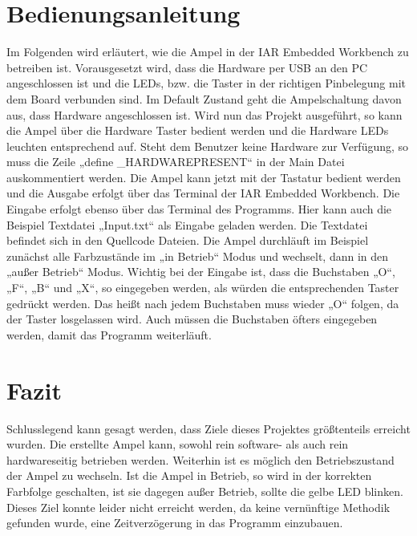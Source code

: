 \chapter{Bedienungsanleitung}
Im Folgenden wird erläutert, wie die Ampel in der IAR Embedded Workbench zu betreiben ist. Vorausgesetzt wird, dass die Hardware per USB an den PC angeschlossen ist und die LEDs, bzw. die Taster in der richtigen Pinbelegung mit dem Board verbunden sind. Im Default Zustand geht die Ampelschaltung davon aus, dass Hardware angeschlossen ist. Wird nun das Projekt ausgeführt, so kann die Ampel über die Hardware Taster bedient werden und die Hardware LEDs leuchten entsprechend auf. Steht dem Benutzer keine Hardware zur Verfügung, so muss die Zeile „define \_HARDWAREPRESENT“ in der Main Datei auskommentiert werden. Die Ampel kann jetzt mit der Tastatur bedient werden und die Ausgabe erfolgt über das Terminal der IAR Embedded Workbench. Die Eingabe erfolgt ebenso über das Terminal des Programms. Hier kann auch die Beispiel Textdatei „Input.txt“ als Eingabe geladen werden. Die Textdatei befindet sich in den Quellcode Dateien. Die Ampel durchläuft im Beispiel zunächst alle Farbzustände im „in Betrieb“ Modus und wechselt, dann in den „außer Betrieb“ Modus. Wichtig bei der Eingabe ist, dass die Buchstaben „O“, „F“, „B“ und „X“, so eingegeben werden, als würden die entsprechenden Taster gedrückt werden. Das heißt nach jedem Buchstaben muss wieder „O“ folgen, da der Taster losgelassen wird. Auch müssen die Buchstaben öfters eingegeben werden, damit das Programm weiterläuft.

\chapter{Fazit}
Schlusslegend kann gesagt werden, dass Ziele dieses Projektes größtenteils erreicht wurden. Die erstellte Ampel kann, sowohl rein software- als auch rein hardwareseitig betrieben werden. Weiterhin ist es möglich den Betriebszustand der Ampel zu wechseln. Ist die Ampel in Betrieb, so wird in der korrekten Farbfolge geschalten, ist sie dagegen außer Betrieb, sollte die gelbe LED blinken. Dieses Ziel konnte leider nicht erreicht werden, da keine vernünftige Methodik gefunden wurde, eine Zeitverzögerung in das Programm einzubauen. 


